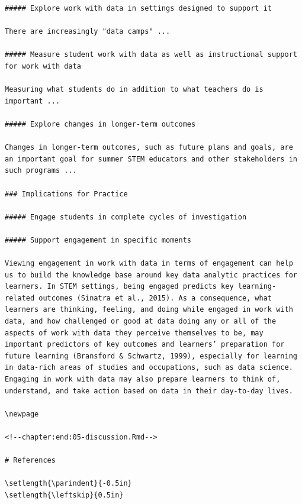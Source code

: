 \documentclass[]{msu-thesis}
\theoremstyle{definition}
\theoremstyle{definition}
\theoremstyle{definition}
\theoremstyle{remark}
\begin{document}
\begin{verbatim}
##### Explore work with data in settings designed to support it

There are increasingly "data camps" ...

##### Measure student work with data as well as instructional support for work with data

Measuring what students do in addition to what teachers do is important ...

##### Explore changes in longer-term outcomes

Changes in longer-term outcomes, such as future plans and goals, are an important goal for summer STEM educators and other stakeholders in such programs ...

### Implications for Practice

##### Engage students in complete cycles of investigation

##### Support engagement in specific moments

Viewing engagement in work with data in terms of engagement can help us to build the knowledge base around key data analytic practices for learners. In STEM settings, being engaged predicts key learning-related outcomes (Sinatra et al., 2015). As a consequence, what learners are thinking, feeling, and doing while engaged in work with data, and how challenged or good at data doing any or all of the aspects of work with data they perceive themselves to be, may important predictors of key outcomes and learners’ preparation for future learning (Bransford & Schwartz, 1999), especially for learning in data-rich areas of studies and occupations, such as data science. Engaging in work with data may also prepare learners to think of, understand, and take action based on data in their day-to-day lives.

\newpage

<!--chapter:end:05-discussion.Rmd-->

# References

\setlength{\parindent}{-0.5in}
\setlength{\leftskip}{0.5in}


\end{verbatim}
\end{document}
